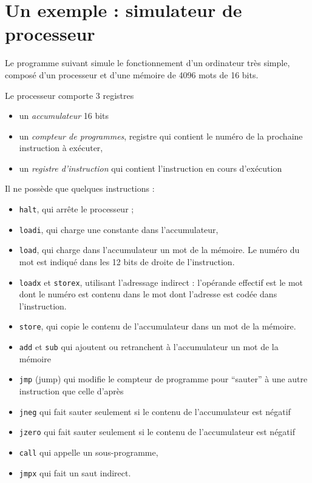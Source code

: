 \documentclass[10pt]{article}
\begin{document}
 
\appendix
\section{Un exemple : simulateur de processeur}


Le programme suivant simule le fonctionnement d'un ordinateur très
simple, composé d'un processeur et d'une mémoire de 4096 mots de 16
bits.

Le processeur comporte 3 registres
\begin{itemize}
\item un \emph{accumulateur} 16 bits
\item un \emph{compteur de programmes}, registre qui contient le
  numéro de la prochaine instruction à exécuter,
\item un \emph{registre d'instruction} qui contient l'instruction en
  cours d'exécution
\end{itemize}

Il ne possède que quelques instructions :
\begin{itemize}
\item \texttt{halt}, qui arrête le processeur ;
\item \texttt{loadi}, qui charge une constante dans l'accumulateur,
\item \texttt{load}, qui charge dans l'accumulateur un mot de la mémoire. Le
  numéro du mot est indiqué dans les 12 bits de droite de
  l'instruction.
\item \texttt{loadx} et \texttt{storex}, utilisant l'adressage indirect : l'opérande effectif est le mot
dont le numéro est contenu dans le mot dont l'adresse est codée dans l'instruction. 
\item \texttt{store}, qui copie le contenu de l'accumulateur dans un mot de la mémoire. 
\item \texttt{add} et \texttt{sub} qui ajoutent ou retranchent à l'accumulateur un mot de la mémoire
\item \texttt{jmp} (jump) qui modifie le compteur de programme pour ``sauter'' à une autre instruction que celle d'après
\item \texttt{jneg} qui fait sauter seulement si le contenu de l'accumulateur est négatif
\item \texttt{jzero} qui fait sauter seulement si le contenu de l'accumulateur est négatif
\item \texttt{call} qui appelle un sous-programme,
\item \texttt{jmpx} qui fait un saut indirect.
\end{itemize}
\end{document}
